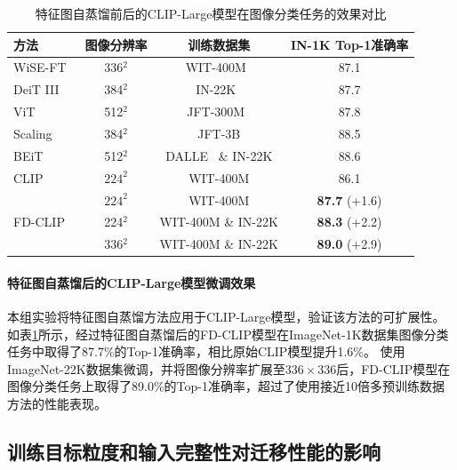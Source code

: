 \begin{table}
\caption{
特征图自蒸馏前后的CLIP-Large模型在图像分类任务的效果对比
}
\centering
  \begin{tabular}{lccc}
\toprule
 方法 & 图像分辨率 & 训练数据集 & IN-1K Top-1准确率 \\
  \midrule
    WiSE-FT~\cite{ftclip2021} & 336$^2$ & WIT-400M~\cite{radford2021learning} & 87.1 \\
    DeiT III~\cite{touvron2022deit} & 384$^2$ & IN-22K~\cite{deng2009imagenet} & 87.7 \\
    ViT~\cite{dosovitskiy2020vit} & 512$^2$ & JFT-300M~\cite{Sun_2017_JFT300m} & 87.8 \\
   Scaling~\cite{zhai2022scaling} &  384$^2$ &  JFT-3B\cite{zhai2022scaling} &  88.5 \\
   BEiT~\cite{bao2021beit} &  512$^2$ &  DALLE~\cite{ramesh2021dalle1} \& IN-22K &  88.6 \\

  \midrule
  CLIP & $224^2$ & WIT-400M & 86.1 \\
  \midrule
  \multirow{3}{*}{FD-CLIP} & $224^2$ & WIT-400M & \textbf{87.7}\scriptsize{ (+1.6)} \\
   & 224$^2$ & WIT-400M \& IN-22K & \textbf{88.3}\scriptsize{ (+2.2)} \\
   & 336$^2$ & WIT-400M \& IN-22K & \textbf{89.0}\scriptsize{ (+2.9)} \\
\bottomrule
  \end{tabular}
\label{tab:fd-clip_large_FD}
\end{table}

\paragraph{特征图自蒸馏后的CLIP-Large模型微调效果} 本组实验将特征图自蒸馏方法应用于CLIP-Large模型，验证该方法的可扩展性。
如表\ref{tab:fd-clip_large_FD}所示，经过特征图自蒸馏后的FD-CLIP模型在ImageNet-1K数据集图像分类任务中取得了87.7\%的Top-1准确率，相比原始CLIP模型提升1.6\%。
使用ImageNet-22K数据集微调，并将图像分辨率扩展至$336\times 336$后，FD-CLIP模型在图像分类任务上取得了89.0\%的Top-1准确率，超过了使用接近10倍多预训练数据方法\cite{zhai2022scaling}的性能表现。%

\subsection{训练目标粒度和输入完整性对迁移性能的影响}
\label{sec:fd-exp-input}

